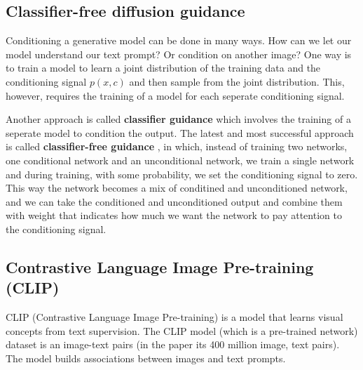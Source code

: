 \subsection{Classifier-free diffusion guidance}

\label{subsec:classifier_free_diffusion_guidance}

Conditioning a generative model can be done in many ways. How can we let our model understand our text prompt? Or condition on another image? One way is to train a model to learn a joint distribution of the training data and the conditioning signal $p(x,c)$ and then sample from the joint distribution. This, however, requires the training of a model for each seperate conditioning signal.

Another approach is called \textbf{classifier guidance} \cite{openai_diffusion_beats_gans} which involves the training of a seperate model to condition the output. The latest and most successful approach is called \textbf{classifier-free guidance} \cite{classifier_free_guidance}, in which, instead of training two networks, one conditional network and an unconditional network, we train a single network and during training, with some probability, we set the conditioning signal to zero. This way the network becomes a mix of conditined and unconditioned network, and we can take the conditioned and unconditioned output and combine them with weight that indicates how much we want the network to pay attention to the conditioning signal.








\subsection{Contrastive Language Image Pre-training (CLIP)}

\label{subsec:clip}

CLIP (Contrastive Language Image Pre-training) \cite{openai_clip} is a model that learns visual concepts from text supervision. The CLIP model (which is a pre-trained network) dataset is an image-text pairs (in the paper its 400 million image, text pairs). The model builds associations between images and text prompts. 

